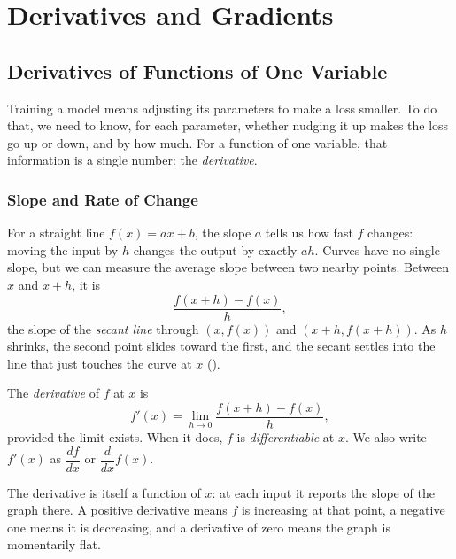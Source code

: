 \chapter{Derivatives and Gradients}
\label{chap:ch02}


\section{Derivatives of Functions of One Variable}
\label{sec:ch02-single}

Training a model means adjusting its parameters to make a loss smaller.
To do that, we need to know, for each parameter, whether nudging it up
makes the loss go up or down, and by how much. For a function of one
variable, that information is a single number: the \emph{derivative}.

\subsection{Slope and Rate of Change}
\label{sec:ch02-slope}

For a straight line $f(x) = ax + b$, the slope $a$ tells us how fast $f$
changes: moving the input by $h$ changes the output by exactly $ah$. Curves
have no single slope, but we can measure the average slope between two
nearby points. Between $x$ and $x + h$, it is
\[
  \frac{f(x + h) - f(x)}{h},
\]
the slope of the \emph{secant line} through $(x, f(x))$ and
$(x + h, f(x + h))$. As $h$ shrinks, the second point slides toward the
first, and the secant settles into the line that just touches the curve at
$x$ ().

\begin{definition}[Derivative]
  \label{def:derivative}
  The \emph{derivative} of $f$ at $x$ is
  \[
    f'(x) = \lim_{h \to 0} \frac{f(x + h) - f(x)}{h},
  \]
  provided the limit exists. When it does, $f$ is \emph{differentiable}
  at $x$. We also write $f'(x)$ as $\dfrac{df}{dx}$ or
  $\dfrac{d}{dx} f(x)$.
\end{definition}

The derivative is itself a function of $x$: at each input it reports the
slope of the graph there. A positive derivative means $f$ is increasing at
that point, a negative one means it is decreasing, and a derivative of
zero means the graph is momentarily flat.

